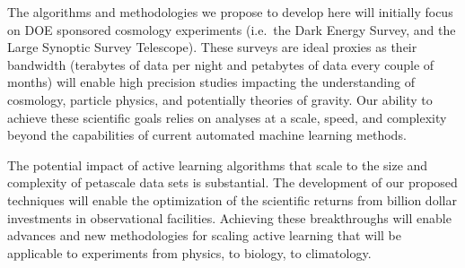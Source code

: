 \documentclass[useAMS,usenatbib,tightenlines,11pt,preprint]{aastex}
\begin{document}
The algorithms and methodologies we propose to develop here will
initially focus on DOE sponsored cosmology experiments (i.e.\ the Dark
Energy Survey, and the Large Synoptic Survey Telescope). These surveys
are ideal proxies as their bandwidth (terabytes of data per night and
petabytes of data every couple of months) will enable high precision
studies impacting the understanding of cosmology, particle physics,
and potentially theories of gravity.  Our ability to achieve these
scientific goals relies on analyses at a scale, speed, and complexity
beyond the capabilities of current automated machine learning methods.

The potential impact of active learning algorithms that scale to the
size and complexity of petascale data sets is substantial. The
development of our proposed techniques will enable the optimization of
the scientific returns from billion dollar investments in
observational facilities. Achieving these breakthroughs will enable
advances and new methodologies for scaling active learning that will
be applicable to experiments from physics, to biology, to climatology.
\end{document}
